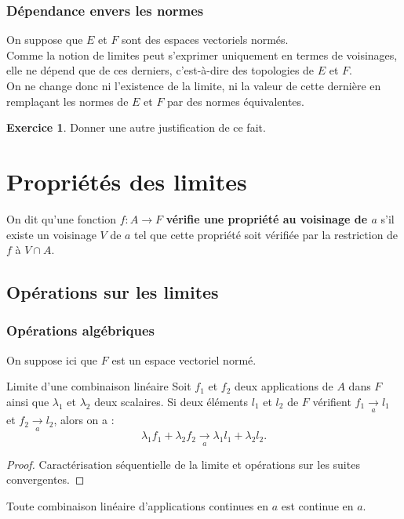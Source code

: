 \documentclass[french]{article}
\theoremstyle{plain}
\theoremstyle{definition}
\newtheorem{exo}{Exercice}
\theoremstyle{remark}
\begin{document}
\subsubsection*{Dépendance envers les normes}
On suppose que $E$ et $F$ sont des espaces vectoriels normés.\\
Comme la notion de limites peut s'exprimer uniquement en termes de voisinages, elle ne dépend que de ces derniers, c'est-à-dire des topologies de $E$ et $F$. \\
On ne change donc ni l'existence de la limite, ni la valeur de cette dernière en remplaçant les normes de $E$ et $F$ par des normes équivalentes.
\begin{exo}
	Donner une autre justification de ce fait. %
\end{exo}

\section{Propriétés des limites}

On dit qu'une fonction $f:A\to F$ \textbf{vérifie une propriété au voisinage de $a$} s'il existe un voisinage $V$ de $a$ tel que cette propriété soit vérifiée par la restriction de $f$ à $V\cap A$.

\subsection{Opérations sur les limites}

\subsubsection*{Opérations algébriques}

On suppose ici que $F$ est un espace vectoriel normé.

\begin{thm}{Limite d'une combinaison linéaire}%
	Soit $f_1$ et $f_2$ deux applications de $A$ dans $F$ ainsi que $\lambda_1$ et $\lambda_2$ deux scalaires. Si deux éléments $l_1$ et $l_2$ de $F$ vérifient $f_1\xrightarrow[a]{}l_1$ et $f_2\xrightarrow[a]{}l_2$, alors on a : $$\lambda_1f_1+\lambda_2f_2\xrightarrow[a]{}\lambda_1l_1+\lambda_2l_2.$$
\end{thm}
\begin{proof}
	Caractérisation séquentielle de la limite et opérations sur les suites convergentes.
\end{proof}

\begin{thm}{}%
	Toute combinaison linéaire d'applications continues en $a$ est continue en $a$.
\end{thm}
\end{document}
